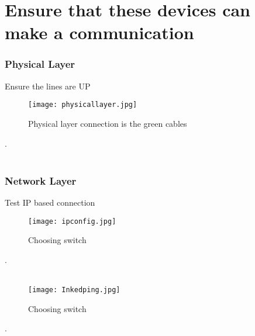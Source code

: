 \documentclass[onecolumn]{article}
\begin{document}
\section{Ensure that these devices can make a communication}
\label{sec:4}

\subsubsection{Physical Layer}
\label{sec:4.0.1}

Ensure the lines are UP

\begin{figure}[ht!]
\centering
\texttt{[image: physicallayer.jpg]}
\caption{Physical layer connection is the green cables \label{}}
\end{figure}
.\\\\


\subsubsection{Network Layer}
\label{sec:4.0.2}

Test IP based connection
\begin{figure}[ht!]
\centering
\texttt{[image: ipconfig.jpg]}
\caption{Choosing switch \label{}}
\end{figure}
.\\\\
\begin{figure}[ht!]
\centering
\texttt{[image: Inkedping.jpg]}
\caption{Choosing switch \label{}}
\end{figure}
.\\\\




 
\nocite{*}


\end{document}
